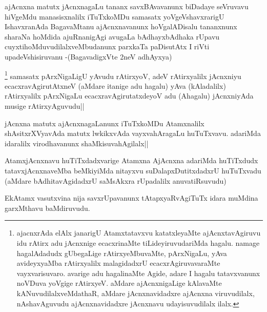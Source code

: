 \begin{artha}
ajAcnxna matutx jAcnxnagaLu tananx savxBAvavanunx biDadaye seVruvavu hiVgeMdu manasisxnalilx iTuTxkoMDu samasatx yoVgeVshavxrarigU IshavxranAda BagavaMtanu ajAcnxnavanunx hoVgalADisalu tananxnunx sharaNa hoMdida ajuRnanigAgi avugaLa bAdhayxbAdhaka rUpavu cuyxtihoMduvudilalxveMbudanunx parxkaTa paDisutAtx I riVti upadeVshisiruvanu -(BagavadigxVte 2neV adhAyxya)
\end{artha}

\begin{artha}
\footnote[1]{ajacnxrAda elAlx janarigU Atamxtatavxvu katatxleyaMte ajAcnxtavAgiruvu idu rAtirx adu jAcnxnige ecacxrinaMte tiLideyiruvudariMda hagalu. namage hagalAdadudx gUbegaLige rAtirxyeMbuvaMte, pArxNigaLu, yAva avideyxyaMba rAtirxyalilx malagidadxrU ecacxrAgiruvavaraMte vayxvarisuvaro. avarige adu hagalinaMte Agide, adare I hagalu tatavxvanunx noVDuva yoVgige rAtirxyeV. aMdare ajAcnxnigaLige kAlavaMte kANuvudilalxveMdathaR, aMdare jAcnxnavidadxre ajAcnxna viruvudilalx, nAshavAguvudu ajAcnxnavidadxre jAcnxnavu udayisuvudilalx ilalx.} samasatx pArxNigaLigU yAvudu rAtirxyoV, adeV rAtirxyalilx jAcnxniyu ecacxravAgirutAtxneV (aMdare itanige adu hagalu) yAva (kAladalilx) rAtirxyalilx pArxNigaLu ecacxravAgirutatxdeyoV adu (Ahagalu) jAcnxniyAda musige rAtirxyAguvudu||
\end{artha}

\begin{artha}%
jAcnxna matutx ajAcnxnagaLanunx iTuTxkoMDu Atamxnalilx shAsitxrXVyavAda matutx lwkikxvAda vayxvahAragaLu huTuTxvavu. adariMda idaralilx virodhavanunx shaMkisuvahAgilalx||
\end{artha}


\begin{artha}
AtamxjAcnxnavu huTiTxdadxvarige Atamxna AjAcnxna adariMda huTiTxdudx tatavxjAcnxnaveMba beMkiyiMda nitayxvu suDalapxDutitxdadxrU huTuTxvadu (aMdare bAdhitavAgidadxrU saMsAkxra rUpadalilx anuvatiRsuvudu) 
\end{artha}

\begin{artha}
EkAtamx vasutxvina nija savxrUpavanunx tAtapxyaRvAgiTuTx idara muMdina garxMthavu baMdiruvudu. 
\end{artha}



